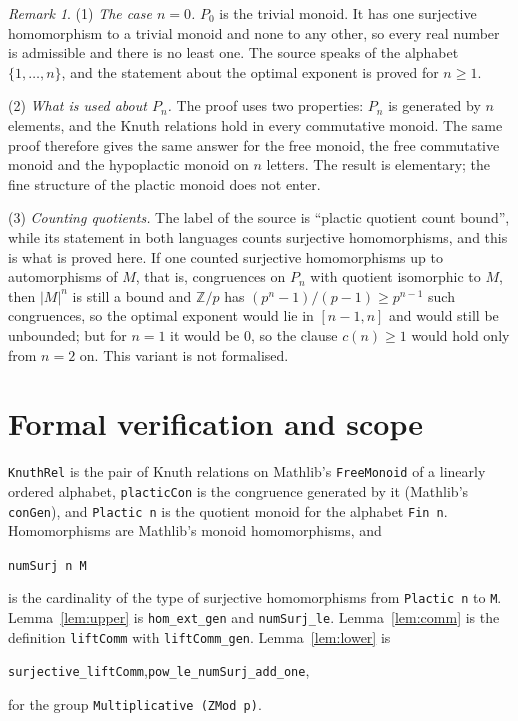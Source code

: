 \documentclass[11pt]{article}
\theoremstyle{remark}
\newtheorem*{remark}{Remark}
\begin{document}
\begin{remark}
(1) \emph{The case $n=0$.} $P_0$ is the trivial monoid. It has one
surjective homomorphism to a trivial monoid and none to any other, so
every real number is admissible and there is no least one. The source
speaks of the alphabet $\{1,\dots,n\}$, and the statement about the
optimal exponent is proved for $n\ge1$.

(2) \emph{What is used about $P_n$.} The proof uses two properties: $P_n$
is generated by $n$ elements, and the Knuth relations hold in every
commutative monoid. The same proof therefore gives the same answer for
the free monoid, the free commutative monoid and the hypoplactic monoid
on $n$ letters. The result is elementary; the fine structure of the
plactic monoid does not enter.

(3) \emph{Counting quotients.} The label of the source is ``plactic
quotient count bound'', while its statement in both languages counts
surjective homomorphisms, and this is what is proved here. If one
counted surjective homomorphisms up to automorphisms of $M$, that is,
congruences on $P_n$ with quotient isomorphic to $M$, then $|M|^n$ is
still a bound and $\mathbb Z/p$ has $(p^n-1)/(p-1)\ge p^{n-1}$ such
congruences, so the optimal exponent would lie in $[n-1,n]$ and would
still be unbounded; but for $n=1$ it would be $0$, so the clause
$c(n)\ge1$ would hold only from $n=2$ on. This variant is not
formalised.
\end{remark}

\section*{Formal verification and scope}
\texttt{KnuthRel} is the pair of Knuth relations on Mathlib's
\texttt{FreeMonoid} of a linearly ordered alphabet, \texttt{placticCon}
is the congruence generated by it (Mathlib's \texttt{conGen}), and
\texttt{Plactic n} is the quotient monoid for the alphabet
\texttt{Fin n}. Homomorphisms are Mathlib's monoid homomorphisms, and
\begin{center}\small
\texttt{numSurj n M}
\end{center}
is the cardinality of the type of surjective homomorphisms from
\texttt{Plactic n} to \texttt{M}. Lemma~\ref{lem:upper} is
\texttt{hom\_ext\_gen} and \texttt{numSurj\_le}. Lemma~\ref{lem:comm}
is the definition \texttt{liftComm} with \texttt{liftComm\_gen}.
Lemma~\ref{lem:lower} is
\begin{center}\small
\texttt{surjective\_liftComm},\quad \texttt{pow\_le\_numSurj\_add\_one},
\end{center}
for the group \texttt{Multiplicative (ZMod p)}.
\end{document}
